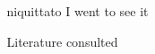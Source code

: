 \documentclass[12pt]{beamer}
\newcommand{\nah}[1]{\textcolor{nahgrn}{#1}}
\newcommand{\trs}[1]{\textcolor{nahblu}{#1}}
\begin{document}
\begin{frame}
\begin{columns}[t]
\begin{column}{.18\linewidth}
    \end{column}
    \begin{column}{.18\linewidth}
      \begin{example}
        \nah{niquittato} \trs{I went to see it}

      \end{example}
      \begin{block}{Literature consulted}
        \nocite{lockhart_NahuatlWrittenLessons2001,andrews_ClaNahuatl03,jordan_BriefNotesNahuatl,canger_ReduplicationNahuatlDialectal1981,wood_OnlineNahuatlDictionary}
        \printbibliography
      \end{block}
    \end{column}
  \end{columns}
  \vfill
\end{frame}
\end{document}
